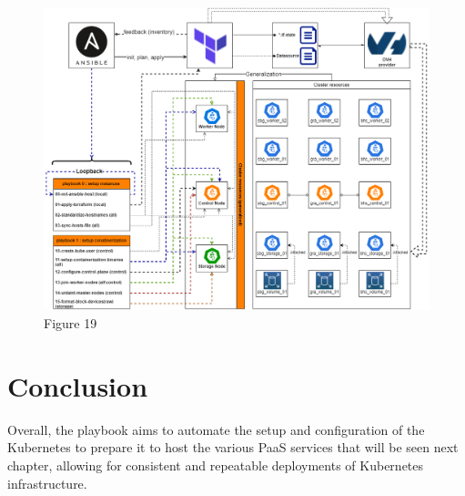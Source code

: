 \begin{figure}[H]\centering
\includegraphics[width=1.0\textwidth,angle=00]{assets/f19.png}
\caption{Figure 19}
\label{fig:fig19}
\end{figure}

\section*{Conclusion}


Overall, the playbook aims to automate the setup and configuration of the Kubernetes to prepare it to host the various PaaS services that will be seen next chapter, allowing for consistent and repeatable deployments of Kubernetes infrastructure.